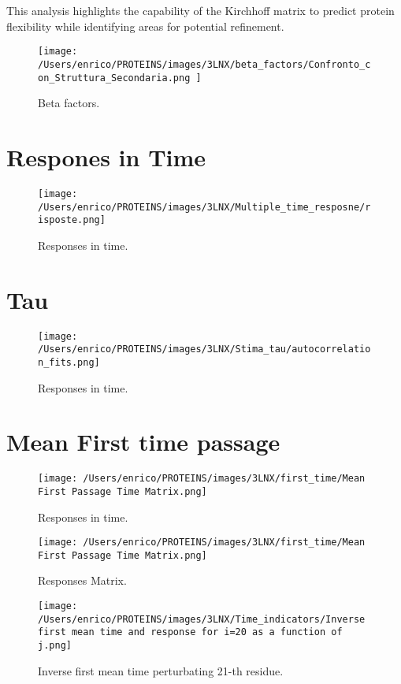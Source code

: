 \documentclass[English, Lau, oneside]{sapthesis}
\begin{document}
\begin{itemize}
This analysis highlights the capability of the Kirchhoff matrix to predict protein flexibility while identifying areas for potential refinement.
\begin{figure}[h!]
    \centering
    \texttt{[image: /Users/enrico/PROTEINS/images/3LNX/beta\_factors/Confronto\_con\_Struttura\_Secondaria.png
    ]}
    \caption{Beta factors.}
\end{figure}

\section*{Respones in Time}
\begin{figure}[h!]
    \centering
    \texttt{[image: /Users/enrico/PROTEINS/images/3LNX/Multiple\_time\_resposne/risposte.png]}
    
    \caption{Responses in time.}
\end{figure}

\section*{Tau}
\begin{figure}[h!]
    \centering
    \texttt{[image: /Users/enrico/PROTEINS/images/3LNX/Stima\_tau/autocorrelation\_fits.png]}
    
    \caption{Responses in time.}
\end{figure}

\section*{Mean First time passage}
\begin{figure}[h!]
    \centering
    \texttt{[image: /Users/enrico/PROTEINS/images/3LNX/first\_time/Mean First Passage Time Matrix.png]}
    \caption{Responses in time.}
\end{figure}
\begin{figure}[h!]
    \centering
    \texttt{[image: /Users/enrico/PROTEINS/images/3LNX/first\_time/Mean First Passage Time Matrix.png]}
    
    \caption{Responses Matrix.}
\end{figure}

\begin{figure}[h!]
    \centering
    \texttt{[image: /Users/enrico/PROTEINS/images/3LNX/Time\_indicators/Inverse first mean time and response for i=20 as a function of j.png]}
    \caption{Inverse first mean time perturbating 21-th residue.}
\end{figure}


\end{itemize}
\end{document}
